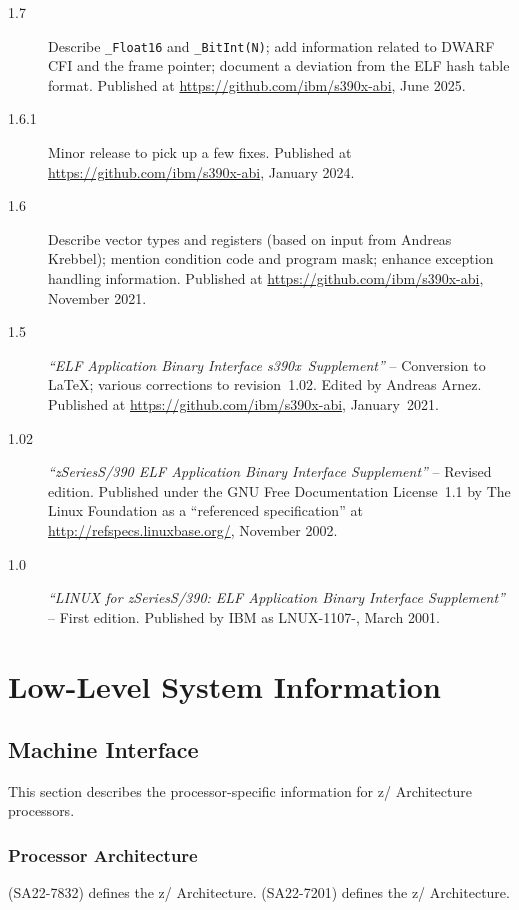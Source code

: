 \documentclass[USenglish,fontsize=11pt,twoside,%
  toc=bib,toc=idx,toc=graduated,numbers=noendperiod,
  bookmarks=true,
  bookmarksnumbered=true,
  bookmarksopen=true,
  bookmarksopenlevel=1,
  breaklinks=true,
  colorlinks=true,
  linkcolor=black,
  pdfpagelayout={TwoPageRight},
  pdfusetitle=true
]{scrreprt}
\newcommand{\ABINAME}{s390x}
\newcommand{\ARCH}{z/\kern-1pt Ar\-chi\-tec\-ture}
\newcommand{\ARCHarch}{\ARCH}
\newcommand{\theARCH}{the \ARCH}
\newcommand{\ABINAME}{s390}
\newcommand{\ARCH}{ESA/390}
\newcommand{\ARCHarch}{the \ARCH{} ar\-chi\-tec\-ture}
\newcommand{\theARCH}{\ARCHarch}
\begin{document}
\begin{description}
\item[1.7] Describe \texttt{\_Float16} and \texttt{\_BitInt(N)}; add
  information related to DWARF CFI and the frame pointer; document a
  deviation from the ELF hash table format.  Published at
  \url{https://github.com/ibm/s390x-abi}, June 2025.
\item[1.6.1] Minor release to pick up a few fixes.  Published at
  \url{https://github.com/ibm/s390x-abi}, January 2024.
\item[1.6] Describe vector types and registers (based on input from
  Andreas Krebbel); mention condition code and program mask; enhance
  exception handling information.  Published at
  \url{https://github.com/ibm/s390x-abi}, November 2021.
\item[1.5] \emph{``ELF Application Binary Interface
    \ABINAME{}~Supplement''} -- Conversion to \LaTeX{}; various
  corrections to revision~1.02.  Edited by Andreas Arnez.  Published at
  \url{https://github.com/ibm/s390x-abi}, January~2021.
\item[1.02] \emph{``{\ifzseries zSeries\else S/390\fi} ELF Application
    Binary Interface Supplement''} -- Revised edition.  Published under
  the GNU Free Documentation License~1.1 by The Linux Foundation as a
  ``referenced specification'' at \url{http://refspecs.linuxbase.org/},
  November 2002.
\item[1.0] \emph{``LINUX for {\ifzseries zSeries\else S/390\fi}: ELF
    Application Binary Interface Supplement''} -- First edition.
  Published by IBM as LNUX-1107-{\fi}, March 2001.
\end{description}

\chapter{Low-Level System Information}
\section{Machine Interface}
This section describes the processor-specific information for
\ARCH{} processors.

\subsection{Processor Architecture}
{\ifzseries
  \cite{sa22} (SA22-7832) defines \theARCH{}.
  \else
  \cite{sa22} (SA22-7201) defines \theARCH{}.
  \fi}
\end{document}
